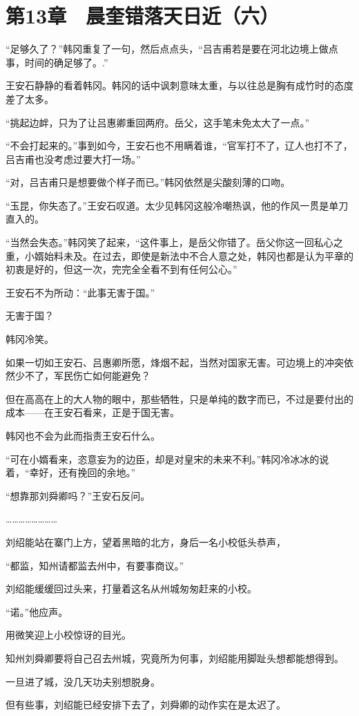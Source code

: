 \section{第13章　晨奎错落天日近（六）}

“足够久了？”韩冈重复了一句，然后点点头，“吕吉甫若是要在河北边境上做点事，时间的确足够了。.”

王安石静静的看着韩冈。韩冈的话中讽刺意味太重，与以往总是胸有成竹时的态度差了太多。

“挑起边衅，只为了让吕惠卿重回两府。岳父，这手笔未免太大了一点。”

“不会打起来的。”事到如今，王安石也不用瞒着谁，“官军打不了，辽人也打不了，吕吉甫也没考虑过要大打一场。”

“对，吕吉甫只是想要做个样子而已。”韩冈依然是尖酸刻薄的口吻。

“玉昆，你失态了。”王安石叹道。太少见韩冈这般冷嘲热讽，他的作风一贯是单刀直入的。

“当然会失态。”韩冈笑了起来，“这件事上，是岳父你错了。岳父你这一回私心之重，小婿始料未及。在过去，即使是新法中不合人意之处，韩冈也都是认为平章的初衷是好的，但这一次，完完全全看不到有任何公心。”

王安石不为所动：“此事无害于国。”

无害于国？

韩冈冷笑。

如果一切如王安石、吕惠卿所愿，烽烟不起，当然对国家无害。可边境上的冲突依然少不了，军民伤亡如何能避免？

但在高高在上的大人物的眼中，那些牺牲，只是单纯的数字而已，不过是要付出的成本——在王安石看来，正是于国无害。

韩冈也不会为此而指责王安石什么。

“可在小婿看来，恣意妄为的边臣，却是对皇宋的未来不利。”韩冈冷冰冰的说着，“幸好，还有挽回的余地。”

“想靠那刘舜卿吗？”王安石反问。

……………………

刘绍能站在寨门上方，望着黑暗的北方，身后一名小校低头恭声，

“都监，知州请都监去州中，有要事商议。”

刘绍能缓缓回过头来，打量着这名从州城匆匆赶来的小校。

“诺。”他应声。

用微笑迎上小校惊讶的目光。

知州刘舜卿要将自己召去州城，究竟所为何事，刘绍能用脚趾头想都能想得到。

一旦进了城，没几天功夫别想脱身。

但有些事，刘绍能已经安排下去了，刘舜卿的动作实在是太迟了。


